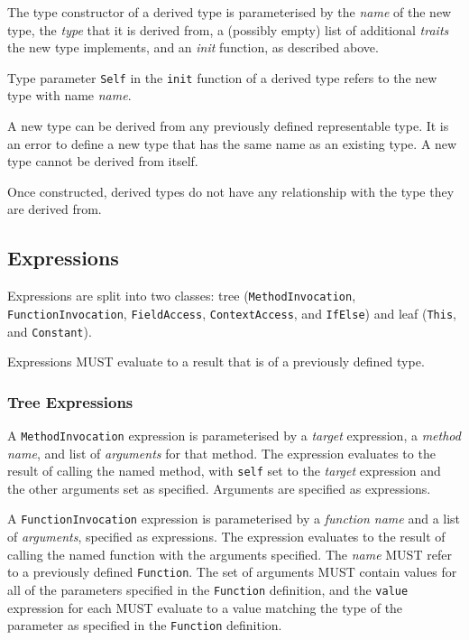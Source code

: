 \documentclass[10pt,twocolumn,a4paper]{article}
\newcommand{\code}[1]{\texttt{#1}}
\begin{document}
The type constructor of a derived type is parameterised by the \emph{name} of
the new type, the \emph{type} that it is derived from, a (possibly empty) list
of additional \emph{traits} the new type implements, and an \emph{init}
function, as described above.

Type parameter \code{Self} in the \code{init} function of a derived type refers
to the new type with name \emph{name}.

A new type can be derived from any previously defined representable type. It is
an error to define a new type that has the same name as an existing type. A new
type cannot be derived from itself.

Once constructed, derived types do not have any relationship with the type they
are derived from.

\subsection{Expressions}
\label{sec:expressions}

Expressions are split into two classes:
tree (\code{MethodInvocation}, \code{FunctionInvocation}, \code{FieldAccess},
      \code{ContextAccess}, and \code{IfElse})
and
leaf (\code{This}, and \code{Constant}).

Expressions MUST evaluate to a result that is of a previously defined type.

\subsubsection{Tree Expressions}

A \code{MethodInvocation} expression is parameterised by a \emph{target} expression, a
\emph{method name}, and list of \emph{arguments} for that method. The expression evaluates
to the result of calling the named method, with \code{self} set to the \emph{target}
expression and the other arguments set as specified. Arguments are specified as expressions.

A \code{FunctionInvocation} expression is parameterised by a \emph{function name} and a list of
\emph{arguments}, specified as expressions. The expression evaluates to the result of
calling the named function with the arguments specified. The \emph{name} MUST refer to
a previously defined \code{Function}. The set
of arguments MUST contain values for all of the parameters specified
in the \code{Function} definition, and the \code{value} expression for each
MUST evaluate to a value matching the type of the parameter as specified in
the \code{Function} definition.
\end{document}
